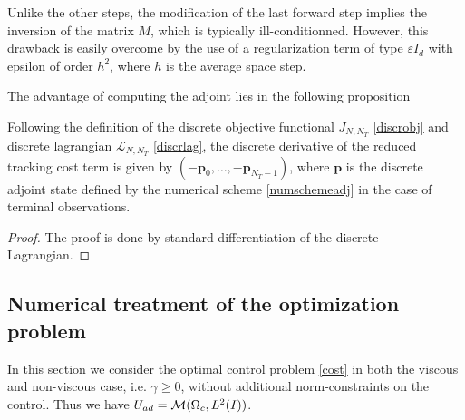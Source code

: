  \begin{remark}
  Unlike the other steps, the modification of the last forward step implies the inversion of the matrix $M$, which is typically ill-conditionned. However, this drawback is easily overcome by the use of a regularization term of type $\varepsilon I_d$ with epsilon of order $h^2$, where $h$ is the average space step.
 \end{remark}

 The advantage of computing the adjoint lies in the following proposition
 \begin{proposition}
 Following the definition of the discrete objective functional $J_{N,N_T}$ \eqref{discrobj} and discrete lagrangian $\mathcal{L}_{N,N_T}$ \eqref{discrlag}, the discrete derivative of the reduced tracking cost term is given by $\left(-\mathbf{p}_0,\ldots,-\mathbf{p}_{N_T-1}\right)$, where $\mathbf{p}$ is the discrete adjoint state defined by the numerical scheme \eqref{numschemeadj} in the case of terminal observations.
 \end{proposition}
\begin{proof}
 The proof is done by standard differentiation of the discrete Lagrangian.
\qquad\end{proof}

\subsection{Numerical treatment of the optimization problem}
{\color{red} In this section we consider the optimal control problem \eqref{cost} in both the viscous and non-viscous case, i.e. $\gamma\geq0$, without additional norm-constraints on the control. Thus we have $U_{ad}=\mathcal{M}(\Omega_c, L^{2}(I))$.} 
